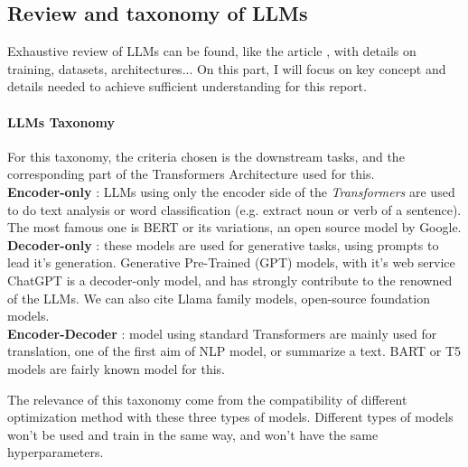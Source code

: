 \subsection{Review and taxonomy of LLMs}
\label{sec:llm_review}
Exhaustive review of LLMs can be found, like the article \cite{raiaan_review_2024}, with details on training, datasets, architectures... On this part, I will focus on key concept and details needed to achieve sufficient understanding for this report.

\paragraph{LLMs Taxonomy}
For this taxonomy, the criteria chosen is the downstream tasks, and the corresponding part of the Transformers Architecture used for this.\\
\textbf{Encoder-only} : LLMs using only the encoder side of the \textit{Transformers} are used to do text analysis or word classification (e.g. extract noun or verb of a sentence). The most famous one is BERT\cite{devlin_bert_2019} or its variations, an open source model by Google.\\
\textbf{Decoder-only} : these models are used for generative tasks, using prompts to lead it's generation. Generative Pre-Trained (GPT) models, with it's web service ChatGPT \cite{openai_gpt-4_2024} is a decoder-only model, and has strongly contribute to the renowned of the LLMs. We can also cite Llama \cite{grattafiori_llama_2024} family models, open-source foundation models.\\
\textbf{Encoder-Decoder} : model using standard Transformers are mainly used for translation, one of the first aim of NLP model, or summarize a text. BART\cite{lewis_bart_2020} or T5\cite{raffel_exploring_2020} models are fairly known model for this.

The relevance of this taxonomy come from the compatibility of different optimization method with these three types of models. Different types of models won't be used and train in the same way, and won't have the same hyperparameters. 

